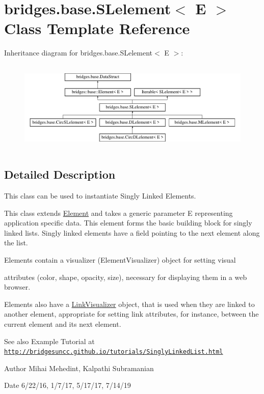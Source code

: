\hypertarget{classbridges_1_1base_1_1_s_lelement}{}\section{bridges.\+base.\+S\+Lelement$<$ E $>$ Class Template Reference}
\label{classbridges_1_1base_1_1_s_lelement}
Inheritance diagram for bridges.\+base.\+S\+Lelement$<$ E $>$\+:\begin{figure}[H]
\begin{center}
\leavevmode
\includegraphics[height=4.402516cm]{classbridges_1_1base_1_1_s_lelement}
\end{center}
\end{figure}


\subsection{Detailed Description}
This class can be used to instantiate Singly Linked Elements. 

This class extends \mbox{\hyperlink{classbridges_1_1base_1_1_element}{Element}} and takes a generic parameter E representing application specific data. This element forms the basic building block for singly linked lists. Singly linked elements have a field pointing to the next element along the list.

\begin{DoxyVerb}Elements contain a visualizer (ElementVisualizer) object for setting visual
\end{DoxyVerb}
 attributes (color, shape, opacity, size), necessary for displaying them in a web browser.

Elements also have a \mbox{\hyperlink{classbridges_1_1base_1_1_link_visualizer}{Link\+Visualizer}} object, that is used when they are linked to another element, appropriate for setting link attributes, for instance, between the current element and its next element.

\begin{DoxySeeAlso}{See also}
Example Tutorial at \href{http://bridgesuncc.github.io/tutorials/SinglyLinkedList.html}{\tt http\+://bridgesuncc.\+github.\+io/tutorials/\+Singly\+Linked\+List.\+html}
\end{DoxySeeAlso}
\begin{DoxyAuthor}{Author}
Mihai Mehedint, Kalpathi Subramanian
\end{DoxyAuthor}
\begin{DoxyDate}{Date}
6/22/16, 1/7/17, 5/17/17, 7/14/19
\end{DoxyDate}

